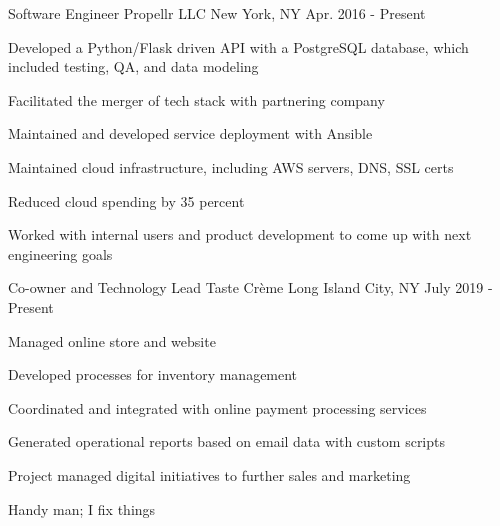 


\begin{cventries}


\cventry
{Software Engineer} %
{Propellr LLC} %
{New York, NY} %
{Apr. 2016 - Present} %
{ %
\begin{cvitems}
\item {Developed a Python/Flask driven API with a PostgreSQL database, which included testing, QA, and data modeling}
\item {Facilitated the merger of tech stack with partnering company}
\item {Maintained and developed service deployment with Ansible}
\item {Maintained cloud infrastructure, including AWS servers, DNS, SSL certs}
\item {Reduced cloud spending by 35 percent}
\item {Worked with internal users and product development to come up with next engineering goals}
\end{cvitems}
\bigskip
}


\cventry
{Co-owner and Technology Lead} %
{Taste Crème} %
{Long Island City, NY} %
{July 2019 - Present} %
{ %
\begin{cvitems}
\item {Managed online store and website}
\item {Developed processes for inventory management}
\item {Coordinated and integrated with online payment processing services}
\item {Generated operational reports based on email data with custom scripts}
\item {Project managed digital initiatives to further sales and marketing}
\item {Handy man; I fix things}
\end{cvitems}
\bigskip
}


\end{cventries}
